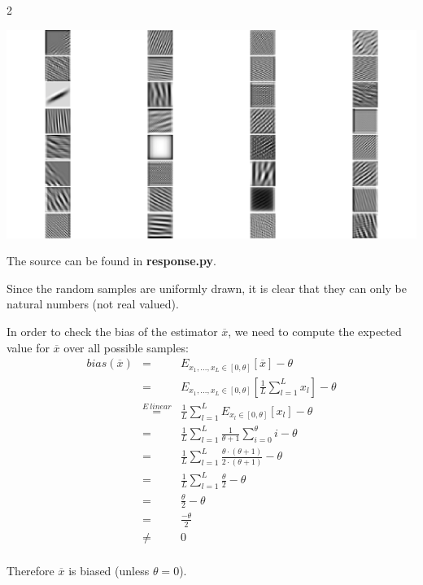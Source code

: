 \documentclass{article}
\begin{document}
\begin{ukon-infie}[3.12.17]{2}
\begin{exercise}[p=20]{}
		\includegraphics[scale=0.5]{resp_conv1.png}
		
		The source can be found in \textbf{response.py}.
				
		\end{exercise}
		\begin{exercise}[p=20]{}
		Since the random samples are uniformly drawn, it is clear that they can only be natural numbers (not real valued).\\
		
		\question{}
		{
				In order to check the bias of the estimator $\overline{x}$, we need to compute the expected value for $\overline{x}$ over all possible samples:\\

		\begin{eqnarray*}
		bias(\overline{x}) 
		&=& E_{x_1, \dots, x_L \in [0, \theta]}[\overline{x}] - \theta \\
		&=& E_{x_1, \dots, x_L \in [0, \theta]}\left[\frac{1}{L}\sum_{l = 1}^L x_l\right] - \theta \\
		&\stackrel{E ~ linear}{=}& \frac{1}{L}\sum_{l = 1}^L E_{x_l \in [0, \theta]}[x_l] - \theta \\
		&=& \frac{1}{L}\sum_{l = 1}^L \frac{1}{\theta + 1}\sum_{i = 0}^{\theta} i - \theta \\
		&=& \frac{1}{L}\sum_{l = 1}^L \frac{\theta \cdot (\theta + 1)}{2 \cdot (\theta + 1)} - \theta \\
		&=& \frac{1}{L}\sum_{l = 1}^L \frac{\theta }{2} - \theta \\
		&=& \frac{\theta }{2} - \theta \\
		&=& \frac{-\theta }{2}\\
		&\not =& 0 \\
		\end{eqnarray*}
		
		Therefore $\overline{x}$ is biased (unless $\theta = 0$).
		}
		

\end{exercise}
\end{ukon-infie}
\end{document}
